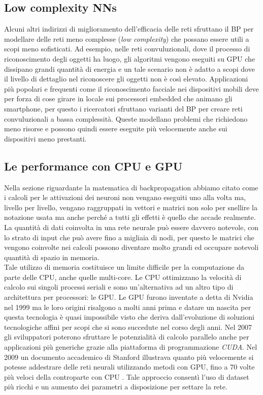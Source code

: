 \subsection*{Low complexity NNs}
Alcuni altri indirizzi di miglioramento dell'efficacia delle reti sfruttano il BP per modellare delle reti meno complesse (\textit{low complexity}) che possano essere utili a scopi meno sofisticati. Ad esempio, nelle reti convuluzionali, dove il processo di riconoscimento degli oggetti ha luogo, gli algoritmi vengono eseguiti su GPU che dissipano grandi quantità di energia e un tale scenario non è adatto a scopi dove il livello di dettaglio nel riconoscere gli oggetti non è così elevato. Applicazioni più popolari e frequenti come il riconoscimento facciale nei dispositivi mobili deve per forza di cose girare in locale sui processori embedded che animano gli smartphone, per questo i ricercatori sfruttano varianti del BP per creare reti convuluzionali a bassa complessità. Queste modellano problemi che richiedono meno risorse e possono quindi essere eseguite più velocemente anche sui dispositivi meno prestanti\cite{TSD}.
\subsection*{Le performance con CPU e GPU}
Nella sezione riguardante la matematica di backpropagation abbiamo citato come i calcoli per le attivazioni dei neuroni non vengano eseguiti uno alla volta ma, livello per livello, vengano raggruppati in vettori e matrici non solo per snellire la notazione usata ma anche perché a tutti gli effetti è quello che accade realmente. La quantità di dati coinvolta in una rete neurale può essere davvero notevole, con lo strato di input che può avere fino a migliaia di nodi, per questo le matrici che vengono coinvolte nei calcoli possono diventare molto grandi ed occupare notevoli quantità di spazio in memoria.\\ 

Tale utilizzo di memoria costituisce un limite difficile per la computazione da parte delle CPU, anche quelle multi-core. Le CPU ottimizzano la velocità di calcolo sui singoli processi seriali e sono un'alternativa ad un altro tipo di architettura per processori: le GPU. Le GPU furono inventate a detta di Nvidia nel 1999 ma le loro origini risalgono a molti anni prima e datare un nascita per questa tecnologia è quasi impossibile visto che deriva dall'evoluzione di soluzioni tecnologiche affini per scopi che si sono succedute nel corso degli anni. Nel 2007 gli sviluppatori poterono sfruttare le potenzialità di calcolo parallelo anche per applicazioni più generiche grazie alla piattaforma di programmazione \textit{CUDA}. Nel 2009 un documento accademico di Stanford illustrava quanto più velocemente si potesse addestrare delle reti neurali utilizzando metodi con GPU, fino a 70 volte più veloci della controparte con CPU \cite{raina2009large}. Tale approccio consentì l'uso di dataset più ricchi e un aumento dei parametri a disposizione per settare la rete. 

